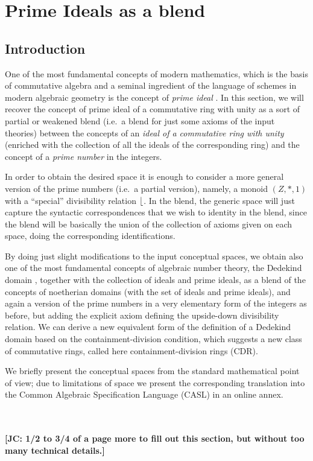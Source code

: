 \section{Prime Ideals as a blend}
\label{sec:prime_ideals}

\subsection*{Introduction}
One of the most fundamental concepts of modern mathematics, which is
the basis of commutative algebra and a seminal ingredient of the
language of schemes in modern algebraic geometry is the concept of \emph{prime
ideal} \parencite{EGAI,eisenbud}. 
In this section, we will recover the concept of prime ideal of a
commutative ring with unity as a sort of partial or weakened blend
(i.e.~a blend for just some axioms of the input theories) between the
concepts of an \emph{ideal of a commutative ring with unity} (enriched with
the collection of all the ideals of the corresponding ring) and the
concept of a \emph{prime number} in the integers.

In order to obtain the desired space it is enough to consider
a more general version of the prime numbers (i.e.~a partial
version), namely, a monoid $(Z,*,1)$ with a ``special'' divisibility
relation $\lfloor$.  In the blend, the generic space will just capture
the syntactic correspondences that we wish to identity in the
blend, since the blend will be basically the union of the
collection of axioms given on each space, doing the corresponding
identifications.

By doing just slight modifications to the input conceptual
spaces, we obtain also one of the most fundamental concepts of
algebraic number theory, the Dedekind domain \parencite[Theorem
37.1]{colemanmultidealtheory}, together with the collection of ideals
and prime ideals, as a blend of the concepts of noetherian domains
(with the set of ideals and prime ideals), and again a version of the
prime numbers in a very elementary form of the integers as before, but
adding the explicit axiom defining the upside-down divisibility
relation.  We can derive a new equivalent form of the definition of a
Dedekind domain based on the containment-division condition, which
suggests a new class of commutative rings, called here
containment-division rings (CDR).

We briefly present the conceptual spaces from the standard
mathematical point of view; due to limitations of space we 
present the corresponding
translation into the Common Algebraic Specification
Language (CASL) \cite{BidoitMosses2004} in an online annex.

~\\
~\\

\textbf{[JC: 1/2 to 3/4 of a page more to fill out this section, but
    without too many technical details.]}

\newpage
~\\
\newpage
% 



